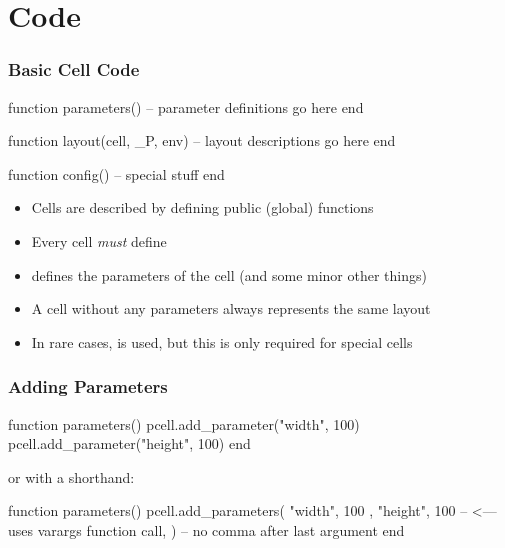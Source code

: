 \documentclass[aspectratio=169, dvipsnames, x11names, svgnames, 11pt]{beamer}
\begin{document}
\section{Code}
\begin{frame}[fragile]
    \frametitle{Basic Cell Code}
    \centering
    \begin{luacode}
        function parameters()
            -- parameter definitions go here
        end

        function layout(cell, _P, env)
            -- layout descriptions go here
        end

        function config()
            -- special stuff
        end
    \end{luacode}
    \vfill
    \begin{itemize}
        \item Cells are described by defining public (global) functions
        \item Every cell \emph{must} define 
        \item {} defines the parameters of the cell (and some minor other things)
        \item A cell without any parameters always represents the same layout
        \item In rare cases,  is used, but this is only required for special cells
    \end{itemize}
\end{frame}

\begin{frame}[fragile]
    \frametitle{Adding Parameters}
    \centering
    \begin{luacode}
        function parameters()
            pcell.add_parameter("width", 100)
            pcell.add_parameter("height", 100)
        end
    \end{luacode}
    \vfill

    or with a shorthand:
    \begin{luacode}
        function parameters()
            pcell.add_parameters({
                { "width", 100 },
                { "height", 100 } -- <--- uses varargs function call,
            })                    --      no comma after last argument
        end
    \end{luacode}
\end{frame}
\end{document}
